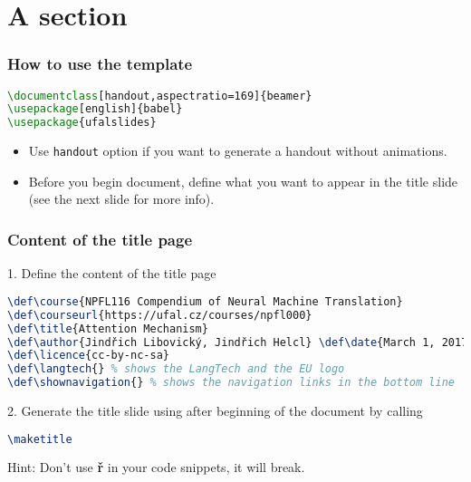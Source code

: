 \documentclass[handout,aspectratio=169]{beamer}
\def\course{NPFL000 Name of the course}
\def\courseurl{https://ufal.cz/courses/npfl000}
\def\title{\LaTeX~template for LangTech courses taught at ÚFAL}
\def\author{Jindřich Libovický}
\def\date{September 7, 2018}
\def\licence{cc-by-nc-sa}
\def\langtech{}
\def\shownavigation{}
\begin{document}
\maketitle


\section{A section}

\begin{frame}[fragile]
    \frametitle{How to use the template}

    \begin{lstlisting}[language=TeX]
\documentclass[handout,aspectratio=169]{beamer}
\usepackage[english]{babel}
\usepackage{ufalslides}
\end{lstlisting}

    \begin{itemize}
        \item Use \lstinline{handout} option if you want to generate a handout without
    animations.

        \item Before you begin document, define what you want to
            appear in the title slide (see the next slide for more info).
    \end{itemize}

\end{frame}


\begin{frame}[fragile]
    \frametitle{Content of the title page}

1. Define the content of the title page
    \begin{lstlisting}[language=TeX]
\def\course{NPFL116 Compendium of Neural Machine Translation}
\def\courseurl{https://ufal.cz/courses/npfl000}
\def\title{Attention Mechanism}
\def\author{Jindřich Libovický, Jindřich Helcl} \def\date{March 1, 2017}
\def\licence{cc-by-nc-sa}
\def\langtech{} % shows the LangTech and the EU logo
\def\shownavigation{} % shows the navigation links in the bottom line
\end{lstlisting}

2. Generate the title slide using after beginning of the document by calling
\begin{lstlisting}[language=TeX]
\maketitle
\end{lstlisting}

    \vspace{5pt}

    Hint: Don't use \textbf{ř} in your code snippets, it will break.

\end{frame}
\end{document}

